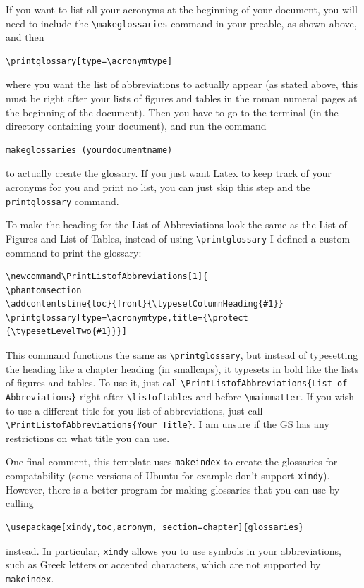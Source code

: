 If you want to list all your acronyms at the beginning of your document, you
will need to include the \verb#\makeglossaries# command in your preable, as
shown above, and then 
\begin{verbatim}
\printglossary[type=\acronymtype]
\end{verbatim}
where you want the list of abbreviations to actually appear 
(as stated above, this must be right after your lists of figures and tables in the roman
numeral pages at the beginning of the document).  Then you have
to go to the terminal (in the directory containing your document), and run the command
\begin{verbatim}
makeglossaries (yourdocumentname)
\end{verbatim}
to actually create the glossary.  If you just want Latex to keep track of your acronyms for you 
and print no list, you can just skip this step and the \verb#printglossary# command.

To make the heading for the List of Abbreviations look the same as the List of Figures
and List of Tables, instead of using \verb#\printglossary# I defined a custom command to print the glossary:
\begin{verbatim}
\newcommand\PrintListofAbbreviations[1]{
\phantomsection
\addcontentsline{toc}{front}{\typesetColumnHeading{#1}}
\printglossary[type=\acronymtype,title={\protect {\typesetLevelTwo{#1}}}]
\end{verbatim}
This command functions the same as \verb#\printglossary#, but instead
of typesetting the heading like a chapter heading (in smallcaps), 
it typesets in bold like the lists of figures and tables.  
To use it, just call \verb#\PrintListofAbbreviations{List of Abbreviations}#
right after \verb#\listoftables# and before \verb#\mainmatter#.
If you wish to use a different title for you list of abbreviations,
just call \verb#\PrintListofAbbreviations{Your Title}#.
I am unsure if the GS has any restrictions on what title you can use.

One final comment, this template uses \verb#makeindex# to create the glossaries
for compatability (some versions of Ubuntu for example don't support \verb#xindy#).
However, there is a better program for making glossaries that you can use by calling
\begin{verbatim}
\usepackage[xindy,toc,acronym, section=chapter]{glossaries}
\end{verbatim}
instead.  In particular, \verb#xindy# allows you to use symbols in your abbreviations,
such as Greek letters or accented characters, which are not supported by \verb#makeindex#.


